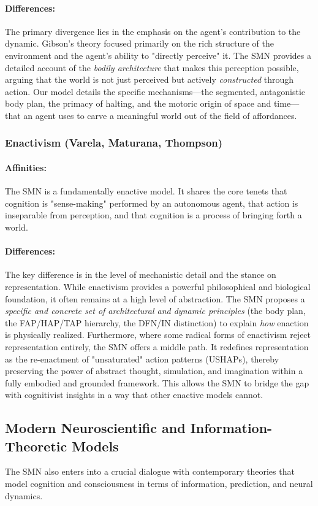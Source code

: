 \paragraph{Differences:} The primary divergence lies in the emphasis on the agent's contribution to the dynamic. Gibson's theory focused primarily on the rich structure of the environment and the agent's ability to "directly perceive" it. The SMN provides a detailed account of the \textit{bodily architecture} that makes this perception possible, arguing that the world is not just perceived but actively \textit{constructed} through action. Our model details the specific mechanisms—the segmented, antagonistic body plan, the primacy of halting, and the motoric origin of space and time—that an agent uses to carve a meaningful world out of the field of affordances.  \subsubsection{Enactivism (Varela, Maturana, Thompson)} \label{ssubsec:enactivism} \paragraph{Affinities:} The SMN is a fundamentally enactive model. It shares the core tenets that cognition is "sense-making" performed by an autonomous agent, that action is inseparable from perception, and that cognition is a process of bringing forth a world.  \paragraph{Differences:} The key difference is in the level of mechanistic detail and the stance on representation. While enactivism provides a powerful philosophical and biological foundation, it often remains at a high level of abstraction. The SMN proposes a \textit{specific and concrete set of architectural and dynamic principles} (the body plan, the FAP/HAP/TAP hierarchy, the DFN/IN distinction) to explain \textit{how} enaction is physically realized. Furthermore, where some radical forms of enactivism reject representation entirely, the SMN offers a middle path. It redefines representation as the re-enactment of "unsaturated" action patterns (USHAPs), thereby preserving the power of abstract thought, simulation, and imagination within a fully embodied and grounded framework. This allows the SMN to bridge the gap with cognitivist insights in a way that other enactive models cannot.
\subsection{Modern Neuroscientific and Information-Theoretic Models}\label{subsec:comparison_modern}The SMN also enters into a crucial dialogue with contemporary theories that model cognition and consciousness in terms of information, prediction, and neural dynamics.
